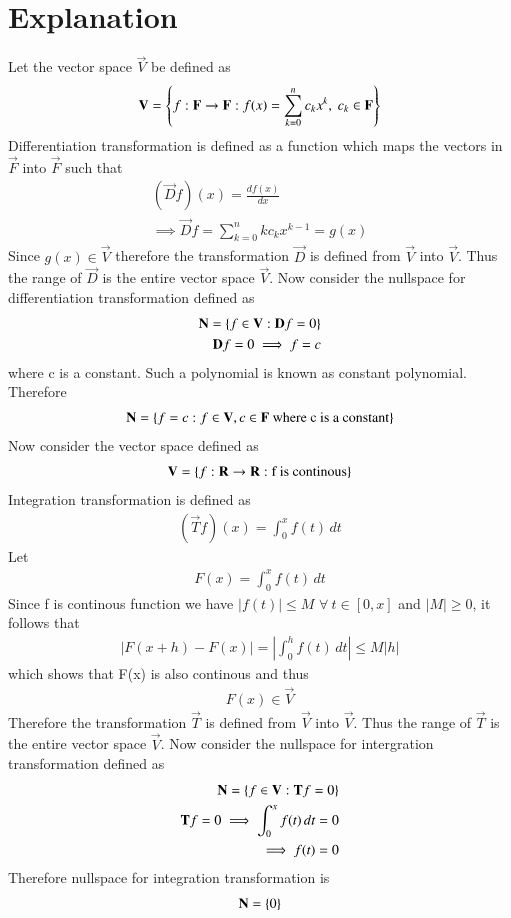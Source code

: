 \documentclass[journal,12pt,twocolumn]{IEEEtran}
\begin{document}
\section{Explanation}
Let the vector space $\vec{V}$ be defined as 
\begin{align}
	\mathbf{V}=\left\{f:\mathbf{F}\rightarrow \mathbf{F} : f(x)=\sum_{k=0}^{n}c_kx^k, \ c_k \in \mathbf{F} \right\}
\end{align}
Differentiation transformation is defined as a function which maps the vectors in $\vec{F}$ into $\vec{F}$ such that
\begin{align}
	(\vec{D}f)(x)=\frac{df(x)}{dx}\\
	\implies 
	\vec{D}f=\sum_{k=0}^{n}kc_kx^{k-1}=g(x)
\end{align}
Since $g(x) \in \vec{V}$ therefore the transformation  $\vec{D}$ is defined from $\vec{V}$ into $\vec{V}$. Thus the range of $\vec{D}$ is the entire vector space $\vec{V}$. Now consider the nullspace 
for differentiation transformation defined as
\begin{align}
	\mathbf{N}=\left\{f \in \mathbf{V} : \mathbf{D}f=0\right\} \\
	\mathbf{D}f=0 \implies f=c
\end{align}
where c is a constant. Such a polynomial is known as constant polynomial. Therefore
\begin{align}
	\mathbf{N}=\left\{f=c : f \in \mathbf{V}, c \in \mathbf{F} \ \text{where c is a constant}\right\}
\end{align}
Now consider the vector space defined as 
\begin{align}
	\mathbf{V}=\left\{f:\mathbf{R} \rightarrow \mathbf{R} : \text{f is continous}\right\}
\end{align}
Integration transformation is defined as 
\begin{align}
	(\vec{T}f)(x)=\int_{0}^{x}f(t)\,dt
\end{align}
Let
\begin{align}
	F(x)=\int_{0}^{x}f(t)\,dt
\end{align}
Since f is continous function we have $\left\vert f(t) \right\vert \leq M$ $\forall \ t \in [0,x] $
and $\left\vert M \right\vert \geq 0$, it follows that
\begin{align}
	\left\vert F(x+h) - F(x) \right\vert = 
	\left\vert \int_{0}^{h} f(t)\,dt \right\vert \leq M\left\vert h \right\vert
\end{align}
which shows that F(x) is also continous and thus
\begin{align}
	F(x) \in \vec{V}
\end{align}
Therefore the transformation $\vec{T}$ is defined from $\vec{V}$ into $\vec{V}$. 
Thus the range of $\vec{T}$ is the entire vector space $\vec{V}$. Now consider the nullspace for 
intergration transformation defined as
\begin{align}
        \mathbf{N}=\left\{f \in \mathbf{V} : \mathbf{T}f=0\right\} \\
        \mathbf{T}f=0 \implies \int_{0}^{x}f(t)\,dt=0  \\
	\implies f(t)=0
\end{align}
Therefore nullspace for integration transformation is
\begin{align}
	\mathbf{N}=\left\{0\right\}
\end{align}
\end{document}
